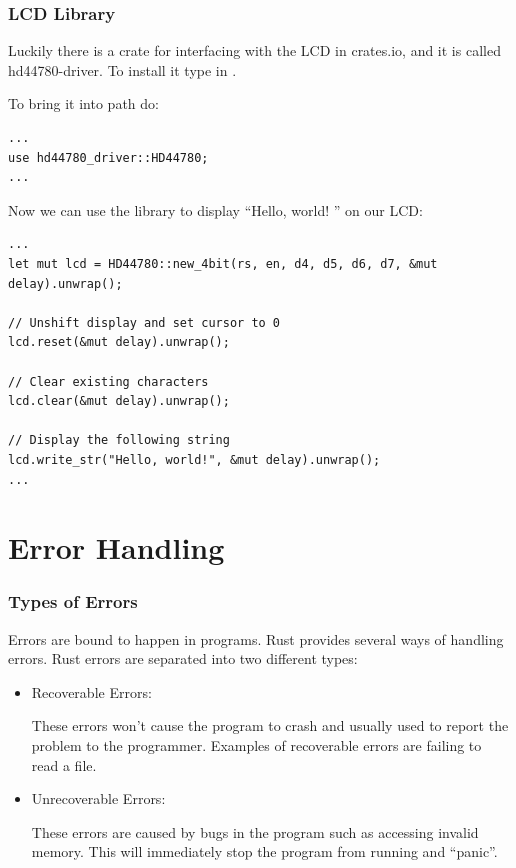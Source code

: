 \documentclass{beamer}
\begin{document}
\begin{frame}
  \frametitle{LCD Library}
  Luckily there is a crate for interfacing with the LCD in crates.io, and it is called hd44780-driver. To install it type in .

  To bring it into path do:
\begin{lstlisting}[]
...
use hd44780_driver::HD44780;
...
\end{lstlisting}

  \pagebreak

  Now we can use the library to display ``Hello, world! '' on our LCD:\@

\begin{lstlisting}[]
...
let mut lcd = HD44780::new_4bit(rs, en, d4, d5, d6, d7, &mut delay).unwrap();

// Unshift display and set cursor to 0
lcd.reset(&mut delay).unwrap();

// Clear existing characters
lcd.clear(&mut delay).unwrap();

// Display the following string
lcd.write_str("Hello, world!", &mut delay).unwrap();
...
\end{lstlisting}
\end{frame}

\section{Error Handling}
\begin{frame}
  \frametitle{Types of Errors}
  Errors are bound to happen in programs. Rust provides several ways of handling errors. Rust errors are separated into two different types:
  \begin{itemize}
    \item{Recoverable Errors:

          These errors won't cause the program to crash and usually used to report the problem to the programmer. Examples of recoverable errors are failing to read a file.}
    \item{Unrecoverable Errors:

          These errors are caused by bugs in the program such as accessing invalid memory. This will immediately stop the program from running and ``panic''.}
  \end{itemize}
\end{frame}
\end{document}
